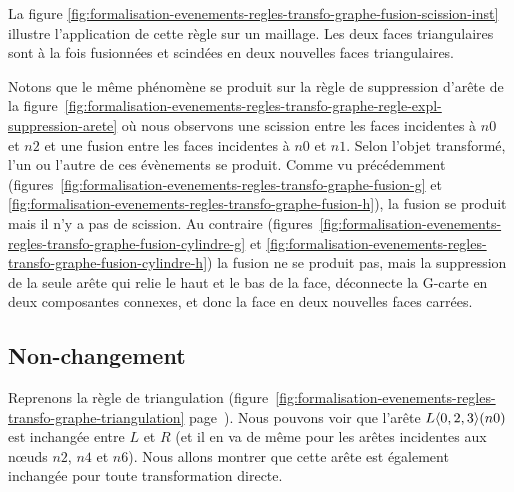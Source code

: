 La figure
\ref{fig:formalisation-evenements-regles-transfo-graphe-fusion-scission-inst}
illustre l'application de cette règle sur un maillage. %
Les deux faces triangulaires sont à la fois fusionnées et scindées en deux
nouvelles faces triangulaires. %

Notons que le même phénomène se produit sur la règle de suppression d'arête de
la
figure~\ref{fig:formalisation-evenements-regles-transfo-graphe-regle-expl-suppression-arete}
où nous observons une scission entre les faces incidentes à $n0$ et $n2$ et une
fusion entre les faces incidentes à $n0$ et $n1$. %
Selon l'objet transformé, l'un ou l'autre de ces évènements se produit. %
Comme vu précédemment
(figures~\ref{fig:formalisation-evenements-regles-transfo-graphe-fusion-g} et
\ref{fig:formalisation-evenements-regles-transfo-graphe-fusion-h}), la fusion se
produit mais il n'y a pas de scission. %
Au contraire
(figures~\ref{fig:formalisation-evenements-regles-transfo-graphe-fusion-cylindre-g}
et \ref{fig:formalisation-evenements-regles-transfo-graphe-fusion-cylindre-h})
la fusion ne se produit pas, mais la suppression de la seule arête qui relie le
haut et le bas de la face, déconnecte la G-carte en deux composantes connexes,
et donc la face en deux nouvelles faces carrées. %



\subsection{Non-changement}
\label{sec:formalisation-evenements-regles-transfo-graphe-non-changement}



Reprenons la règle de triangulation
(figure~\ref{fig:formalisation-evenements-regles-transfo-graphe-triangulation}
page~\pageref{fig:formalisation-evenements-regles-transfo-graphe-triangulation}). %
Nous pouvons voir que l'arête $L\langle0,2,3\rangle(n0)$ est inchangée entre $L$ et
$R$ (et il en va de même pour les arêtes incidentes aux n\oe uds $n2$, $n4$ et
$n6$). %
Nous allons montrer que cette arête est également inchangée pour toute
transformation directe. %



